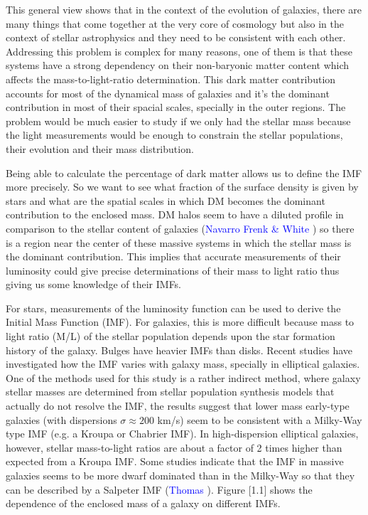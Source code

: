 This general view shows that in the context of the evolution of galaxies, there are many things that come together at the very core of cosmology but also in the context of stellar astrophysics and they need to be consistent with each other. Addressing this problem is complex for many reasons, one of them is that these systems have a strong dependency on their non-baryonic matter content which affects the mass-to-light-ratio determination. This dark matter contribution accounts for most of the dynamical mass of galaxies and it's the dominant contribution in most of their spacial scales, specially in the outer regions. The problem would be much easier to study if we only had the stellar mass because the light measurements would be enough to constrain the stellar populations, their evolution and their mass distribution. 

Being able to calculate the percentage of dark matter allows us to define the IMF more precisely. So we want to see what fraction of the surface density is given by stars and what are the spatial scales in which DM becomes the dominant contribution to the enclosed mass. DM halos seem to have a diluted profile in comparison to the stellar content of galaxies (\textcolor{blue}{Navarro Frenk \& White} \citeyear{Reference17}) so there is a region near the center of these massive systems in which the stellar mass is the dominant contribution. This implies that accurate measurements of their luminosity could give precise determinations of their mass to light ratio thus giving us some knowledge of their IMFs.

For stars, measurements of the luminosity function can be used to derive the Initial Mass Function (IMF). For galaxies, this is more difficult because mass to light ratio (M/L) of the stellar population depends upon the star formation history of the galaxy. Bulges have heavier IMFs than disks. Recent studies have investigated how the IMF varies with galaxy mass, specially in elliptical galaxies. One of the methods used for this study is a rather indirect method, where galaxy stellar masses are determined from stellar population synthesis models that actually do not resolve the IMF, the results suggest that lower mass early-type galaxies (with dispersions $\sigma \approx 200$ km/s) seem to be consistent with a Milky-Way type IMF (e.g. a Kroupa or Chabrier IMF). In high-dispersion elliptical galaxies, however, stellar mass-to-light ratios are about a factor of 2 times higher than expected from a Kroupa IMF. Some studies indicate that the IMF in massive galaxies seems to be more dwarf dominated than in the Milky-Way so that they can be described by a Salpeter IMF (\textcolor{blue}{Thomas} \citeyear{Reference28}). Figure [1.1] shows the dependence of the enclosed mass of a galaxy on different IMFs.

